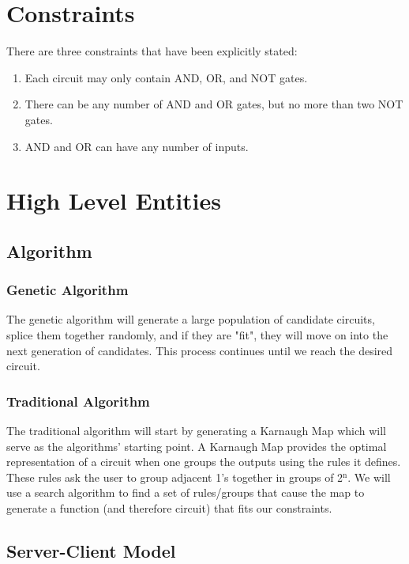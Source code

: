 \documentclass{article}
\begin{document}
\section{Constraints}
\label{sec-3}
There are three constraints that have been explicitly stated:

\begin{enumerate}
\item Each circuit may only contain AND, OR, and NOT gates.
\item There can be any number of AND and OR gates, but no more than two NOT gates.
\item AND and OR can have any number of inputs.
\end{enumerate}

\section{High Level Entities}
\label{sec-4}

\subsection{Algorithm}
\label{sec-4-1}

\subsubsection{Genetic Algorithm}
\label{sec-4-1-1}
The genetic algorithm will generate a large population of candidate circuits,
splice them together randomly, and if they are "fit", they will move on into the
next generation of candidates. This process continues until we reach the desired
circuit.

\subsubsection{Traditional Algorithm}
\label{sec-4-1-2}
The traditional algorithm will start by generating a Karnaugh Map which will
serve as the algorithms' starting point. A Karnaugh Map provides the optimal
representation of a circuit when one groups the outputs using the rules it
defines. These rules ask the user to group adjacent 1's together in groups of
2\(^{\text{n}}\). We will use a search algorithm to find a set of rules/groups that cause the
map to generate a function (and therefore circuit) that fits our constraints.

\subsection{Server-Client Model}
\label{sec-4-2}
\end{document}
